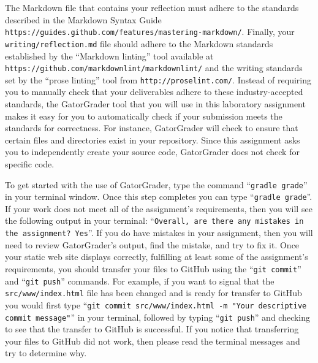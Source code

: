 \documentclass[11pt]{article}
\newcommand{\mainprogramsource}{\lstinline{src/www/index.html}}
\newcommand{\reflection}{\lstinline{writing/reflection.md}}
\newcommand{\gatorgraderstart}{\command{gradle grade}}
\newcommand{\gatorgradercheck}{\command{gradle grade}}
\newcommand{\gitcommit}{\command{git commit}}
\newcommand{\gitpush}{\command{git push}}
\newcommand{\gitcommitmainprogram}{\command{git commit src/www/index.html -m "Your
descriptive commit message"}}
\newcommand{\command}[1]{``\lstinline{#1}''}
\newcommand{\url}[1]{\lstinline{#1}}
\newcommand{\step}[1]{``{#1}''}
\begin{document}
The Markdown file that contains your reflection must adhere to the standards
described in the Markdown Syntax Guide
\url{https://guides.github.com/features/mastering-markdown/}. Finally, your
\reflection{} file should adhere to the Markdown standards established by the
\step{Markdown linting} tool available at
\url{https://github.com/markdownlint/markdownlint/} and the writing standards
set by the \step{prose linting} tool from \url{http://proselint.com/}. Instead
of requiring you to manually check that your deliverables adhere to these
industry-accepted standards, the GatorGrader tool that you will use in this
laboratory assignment makes it easy for you to automatically check if your
submission meets the standards for correctness. For instance, GatorGrader will
check to ensure that certain files and directories exist in your repository.
Since this assignment asks you to independently create your source code,
GatorGrader does not check for specific code.

To get started with the use of GatorGrader, type the command \gatorgraderstart{}
in your terminal window. Once this step completes you can type
\gatorgradercheck{}. If your work does not meet all of the assignment's
requirements, then you will see the following output in your terminal:
\command{Overall, are there any mistakes in the assignment? Yes}. If you do have
mistakes in your assignment, then you will need to review GatorGrader's output,
find the mistake, and try to fix it. Once your static web site displays
correctly, fulfilling at least some of the assignment's requirements, you should
transfer your files to GitHub using the \gitcommit{} and \gitpush{} commands.
For example, if you want to signal that the \mainprogramsource{} file has been
changed and is ready for transfer to GitHub you would first type
\gitcommitmainprogram{} in your terminal, followed by typing \gitpush{} and
checking to see that the transfer to GitHub is successful. If you notice that
transferring your files to GitHub did not work, then please read the terminal
messages and try to determine why.
\end{document}
